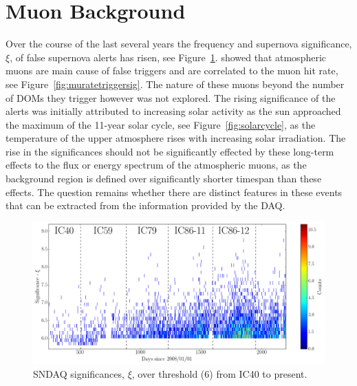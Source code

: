 \section{Muon Background}

Over the course of the last several years the frequency and supernova significance, $\xi$, of false supernova alerts has risen, see Figure~\ref{fig:SNDAQtriggershisto}. \cite{vbaumaster} showed that atmospheric muons are main cause of false triggers and are correlated to the muon hit rate, see Figure~\ref{fig:muratetriggersig}. The nature of these muons beyond the number of DOMs they trigger however was not explored. The rising significance of the alerts was initially attributed to increasing solar activity as the sun approached the maximum of the 11-year solar cycle, see Figure~\ref{fig:solarcycle}, as the temperature of the upper atmosphere rises with increasing solar irradiation. The rise in the significances should not be significantly effected by these long-term effects to the flux or energy spectrum of the atmospheric muons, as the background region is defined over significantly shorter timespan than these effects. The question remains whether there are distinct features in these events that can be extracted from the information provided by the DAQ. 

\begin{figure}[h]
  \begin{center}
    \includegraphics[width=1\textwidth]{./figures/IC40IC863AlertsSigmavsTwebsiteparser.png}
  \end{center}
  \caption{SNDAQ significances, $\xi$, over threshold (6) from IC40 to present. \label{fig:SNDAQtriggershisto}}   
\end{figure}


